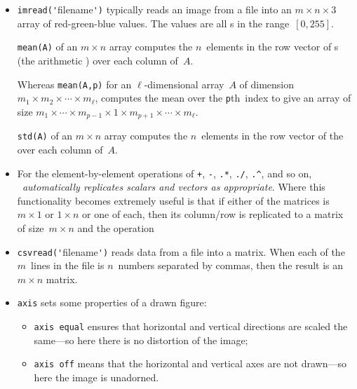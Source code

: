 \begin{itemize}
\begin{itemize}
\item  {}\verb|imread('|filename\verb|')| typically reads an image from a file into an \(m\times n\times 3\) array of red-green-blue values. 
The values are all s in the range~\([0,255]\).

\itemme {}\verb|mean(A)| of an \(m\times n\) array computes the \(n\)~elements in the row vector of s (the arithmetic ) over each column of~\(A\).

Whereas \verb|mean(A,p)| for an \(\ell\)-dimensional array~\(A\) of dimension \(m_1\times m_2\times\cdots\times m_\ell\),  computes the mean over the \verb|p|th~index to give an array of size \(m_1\times\cdots\times m_{p-1}\times1\times m_{p+1}\times\cdots\times m_\ell\).

\itemme {}\verb|std(A)| of an \(m\times n\) array computes the \(n\)~elements in the row vector of the  over each column of~\(A\).

\item For the element-by-element operations of \verb|+|, \verb|-|, \verb|.*|, \verb|./|, \verb|.^|, and so on, \emph{\script\ automatically replicates scalars and vectors as appropriate}.
Where this functionality becomes extremely useful is that if either  of the matrices is \(m\times1\) or \(1\times n\) or one of each, then its column\slash row is replicated to a matrix of size~\(m\times n\) and the operation 

\item  {}\verb|csvread('|filename\verb|')| reads data from a file into a matrix.
When each of the \(m\)~lines in the file is \(n\)~numbers separated by commas, then the result is an \(m\times n\) matrix. 


\item {}\verb|axis| sets some properties of a drawn figure:
\begin{itemize}
\item \verb|axis equal| ensures that horizontal and vertical directions are scaled the same---so here there is no distortion of the image;
\item \verb|axis off| means that the horizontal and vertical axes are not drawn---so here the image is unadorned.
\end{itemize}
\end{itemize}





\end{itemize}

